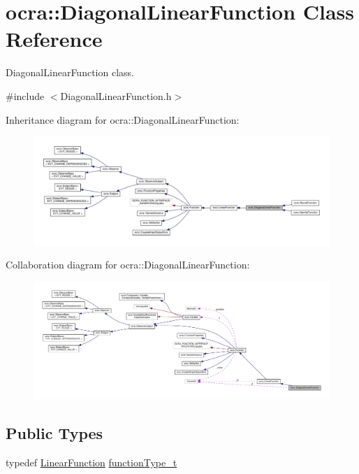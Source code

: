 \hypertarget{classocra_1_1DiagonalLinearFunction}{}\section{ocra\+:\+:Diagonal\+Linear\+Function Class Reference}
\label{classocra_1_1DiagonalLinearFunction}


Diagonal\+Linear\+Function class.  




{\ttfamily \#include $<$Diagonal\+Linear\+Function.\+h$>$}



Inheritance diagram for ocra\+:\+:Diagonal\+Linear\+Function\+:
\nopagebreak
\begin{figure}[H]
\begin{center}
\leavevmode
\includegraphics[width=350pt]{d6/dc4/classocra_1_1DiagonalLinearFunction__inherit__graph}
\end{center}
\end{figure}


Collaboration diagram for ocra\+:\+:Diagonal\+Linear\+Function\+:
\nopagebreak
\begin{figure}[H]
\begin{center}
\leavevmode
\includegraphics[width=350pt]{d4/d85/classocra_1_1DiagonalLinearFunction__coll__graph}
\end{center}
\end{figure}
\subsection*{Public Types}
\begin{DoxyCompactItemize}
\item 
typedef \hyperlink{classocra_1_1LinearFunction}{Linear\+Function} \hyperlink{classocra_1_1DiagonalLinearFunction_ab1d33ba63aea16f86fa88bf574333a39}{function\+Type\+\_\+t}
\end{DoxyCompactItemize}
